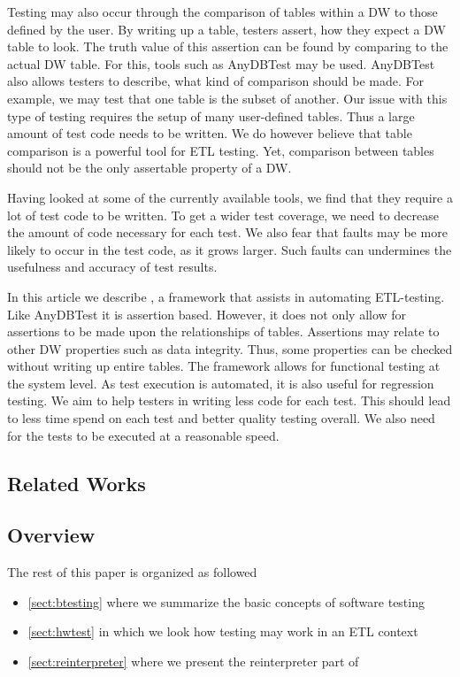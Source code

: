Testing may also occur through the comparison of tables within a DW to those defined by the user. By writing up a table, testers assert, how they expect a DW table to look. The truth value of this assertion can be found by comparing to the actual DW table. For this, tools such as AnyDBTest\cite{AnyDbTest} may be used. AnyDBTest also allows testers to describe, what kind of comparison should be made. For example, we may test that one table is the subset of another. Our issue with this type of testing requires the setup of many user-defined tables. Thus a large amount of test code needs to be written. We do however believe that table comparison is a powerful tool for ETL testing. Yet, comparison between tables should not be the only assertable property of a DW.

Having looked at some of the  currently available tools, we find that they require a lot of test code to be written. To get a wider test coverage, we need to decrease the amount of code necessary for each test. We also fear that faults may be more likely to occur in the test code, as it grows larger. Such faults can undermines the usefulness and accuracy of test results. 

In this article we describe \FW{}, a framework that assists in automating  ETL-testing. Like AnyDBTest it is assertion based. However, it does not only allow for assertions to be made upon the relationships of tables. Assertions may relate to other DW properties such as data integrity. Thus,  some properties can be checked without writing up entire tables. The framework allows for functional testing at the system level. As test execution is automated, it is  also useful for regression testing. We aim to help testers in writing less code for each test. This should lead to less time spend on each test and better quality testing overall. We also need for the tests to be executed at a reasonable speed.  

\subsection{Related Works}


\subsection{Overview}
The rest of this paper is organized as followed
\begin{itemize}
	\item{\cref{sect:btesting} where we summarize the basic concepts of software testing}
	\item{\cref{sect:hwtest} in which we look how testing may work in an ETL context}
	\item{\cref{sect:reinterpreter} where we present the reinterpreter part of \FW}
\end{itemize}

